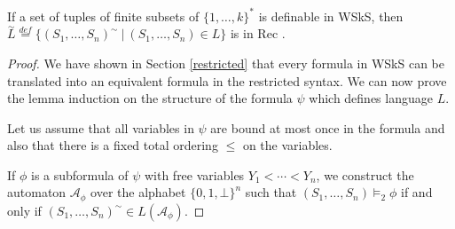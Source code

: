 \begin{lemma}
If a set of tuples of finite subsets of $\{1,\ldots,k\}^*$ is definable in WSkS, then $\overset{\sim}{L} \overset{def}{=} \{(S_1,\ldots,S_n)^\sim\ |\ (S_1,\ldots,S_n) \in L\}$ is in Rec \cite{tata}.
\end{lemma}

\begin{proof}
 We have shown in Section \ref{restricted} that every formula in WSkS can be translated into an equivalent formula in the restricted syntax. We can now prove the lemma induction on the structure of the formula $\psi$ which defines language $L$. 

Let us assume that all variables in $\psi$ are bound at most once in the formula and also that there is a fixed total ordering $\leq$ on the variables.

If $\phi$ is a subformula of $\psi$ with free variables $Y_1 < \cdots < Y_n$, we construct the automaton $\mathcal{A}_\phi$ over the alphabet $\{0,1,\bot\}^n$ such that $(S_1,\ldots,S_n) \vDash_2 \phi$ if and only if $(S_1,\ldots,S_n)^\sim \in L(\mathcal{A}_\phi)$.
\end{proof}

